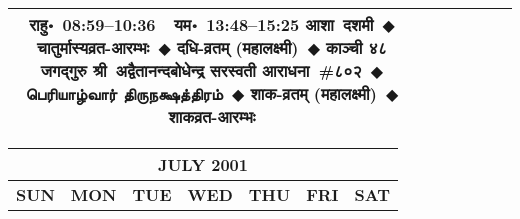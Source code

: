 \documentclass[a3paper,12pt,landscape]{article}
\newcommand{\eventsep}{~$\Diamondblack$ }
\newcommand{\tamil}[1]{%
{\fontspec[Scale=0.9,FakeStretch=0.9]{Noto Sans Tamil} \footnotesize #1}}
\newcommand{\rahuyama}[2]{%
{राहु॰~\textsf{#1}~~यम॰~\textsf{#2}}
}
\begin{document}
\begin{center}
\begin{tabular}{|c|c|c|c|c|c|c|}
{\rahuyama{08:59--10:36}{13:48--15:25}}%
{आशा~दशमी\eventsep चातुर्मास्यव्रत-आरम्भः\eventsep दधि-व्रतम् (महालक्ष्मी)\eventsep काञ्ची ४८ जगद्गुरु श्री~अद्वैतानन्दबोधेन्द्र सरस्वती आराधना~\#{८०२}\eventsep \tamil{பெரியாழ்வார் திருநக்ஷத்திரம்}\eventsep शाक-व्रतम् (महालक्ष्मी)\eventsep शाकव्रत-आरम्भः}
\\ \hline %
\end{tabular}



\begin{tabular}{|c|c|c|c|c|c|c|}
\multicolumn{7}{c}{\Large \bfseries \sffamily JULY 2001}\\[3mm]
\hline
\textbf{\textsf{SUN}} & \textbf{\textsf{MON}} & \textbf{\textsf{TUE}} & \textbf{\textsf{WED}} & \textbf{\textsf{THU}} & \textbf{\textsf{FRI}} & \textbf{\textsf{SAT}} \\ \hline


\end{tabular}
\end{center}
\end{document}
